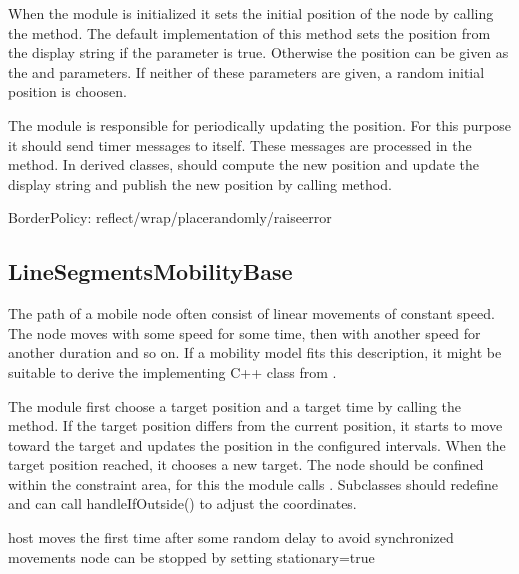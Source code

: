 When the module is initialized it sets the initial position of the node
by calling the  method.
The default implementation of this method sets the position from the
display string if the  parameter is true.
Otherwise the position can be given as the  and
 parameters. If neither of these parameters are given,
a random initial position is choosen.

The module is responsible for periodically updating the position.
For this purpose it should send timer messages to itself. These messages
are processed in the  method. In derived
classes,  should compute the new position
and update the display string and publish the new position by calling
 method.



BorderPolicy: reflect/wrap/placerandomly/raiseerror


\subsection{LineSegmentsMobilityBase}

The path of a mobile node often consist of linear movements of constant
speed. The node moves with some speed for some time, then with another
speed for another duration and so on. If a mobility model fits this
description, it might be suitable to derive the implementing C++ class
from .

The module first choose a target position and a target time by calling
the  method. If the target position differs
from the current position, it starts to move toward the target and
updates the position in the configured  intervals.
When the target position reached, it chooses a new target. The node
should be confined within the constraint area, for this the module calls
. Subclasses should redefine
 and can call handleIfOutside() to
adjust the coordinates.

host moves the first time after some random delay to avoid synchronized movements
node can be stopped by setting stationary=true

